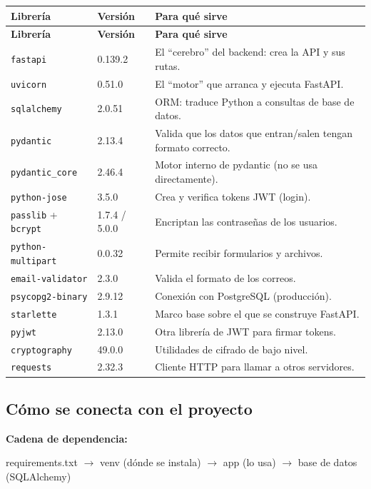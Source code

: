 \documentclass[11pt,a4paper]{article}
\begin{document}
\begin{center}
\begin{longtable}{llp{9.2cm}}
\toprule
\textbf{Librería} & \textbf{Versión} & \textbf{Para qué sirve} \\
\midrule
\endfirsthead
\toprule
\textbf{Librería} & \textbf{Versión} & \textbf{Para qué sirve} \\
\midrule
\endhead
\texttt{fastapi} & 0.139.2 & El ``cerebro'' del backend: crea la API y sus rutas. \\
\texttt{uvicorn} & 0.51.0 & El ``motor'' que arranca y ejecuta FastAPI. \\
\texttt{sqlalchemy} & 2.0.51 & ORM: traduce Python a consultas de base de datos. \\
\texttt{pydantic} & 2.13.4 & Valida que los datos que entran/salen tengan formato correcto. \\
\texttt{pydantic\_core} & 2.46.4 & Motor interno de pydantic (no se usa directamente). \\
\texttt{python-jose} & 3.5.0 & Crea y verifica tokens JWT (login). \\
\texttt{passlib} + \texttt{bcrypt} & 1.7.4 / 5.0.0 & Encriptan las contraseñas de los usuarios. \\
\texttt{python-multipart} & 0.0.32 & Permite recibir formularios y archivos. \\
\texttt{email-validator} & 2.3.0 & Valida el formato de los correos. \\
\texttt{psycopg2-binary} & 2.9.12 & Conexión con PostgreSQL (producción). \\
\texttt{starlette} & 1.3.1 & Marco base sobre el que se construye FastAPI. \\
\texttt{pyjwt} & 2.13.0 & Otra librería de JWT para firmar tokens. \\
\texttt{cryptography} & 49.0.0 & Utilidades de cifrado de bajo nivel. \\
\texttt{requests} & 2.32.3 & Cliente HTTP para llamar a otros servidores. \\
\bottomrule
\end{longtable}
\end{center}

\subsection{Cómo se conecta con el proyecto}

\textbf{Cadena de dependencia:}

\begin{center}
\colorbox{fondocodigo}{\parbox{0.92\textwidth}{\ttfamily\small
requirements.txt $\rightarrow$ venv (dónde se instala) $\rightarrow$ app (lo usa) $\rightarrow$ base de datos (SQLAlchemy)
}}
\end{center}
\end{document}
